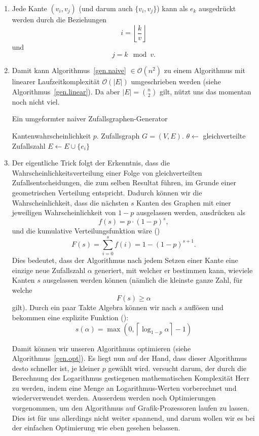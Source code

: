 \documentclass[11pt,abstracton]{scrreprt} %
\theoremstyle{definition}
\begin{document}
\begin{enumerate}
\item Jede Kante $(v_i, v_j)$ (und darum auch $\{v_i, v_j\}$) kann als $e_k$ ausgedrückt werden durch die Beziehungen
\[
i = \left\lfloor\frac k v \right\rfloor
\]
und
\[
j = k \mod v.
\]

\item Damit kann Algorithmus~\ref{gen.naive} $\in \mathcal{O}(n^2)$ zu einem Algorithmus mit linearer Laufzeitkomplexität $\mathcal{O}(|E|)$ umgeschrieben werden (siehe Algorithmus~\ref{gen.linear}). Da aber $|E| = \binom{n}{2}$ gilt, nützt uns das momentan noch nicht viel.

\begin{algorithm}
\caption{Ein umgeformter naiver Zufallsgraphen-Generator}
\label{gen.linear}
\begin{algorithmic}
\Require
	\Statex Kantenwahrscheinlichkeit $p$.
\Ensure
	\Statex Zufallsgraph $G = (V, E)$.
\Statex
{}
\State $\theta\gets$ gleichverteilte Zufallszahl
\State $E \gets E \cup \{e_i\}$
\EndIf
\EndFor
\end{algorithmic}
\end{algorithm}

\item Der eigentliche Trick folgt der Erkenntnis, dass die Wahrscheinlichkeitsverteilung einer Folge von gleichverteilten Zufallsentscheidungen, die zum selben Resultat führen, im Grunde einer geometrischen Verteilung entspricht. Dadurch können wir die Wahrscheinlichkeit, dass die nächsten $s$ Kanten des Graphen mit einer jeweiligen Wahrscheinlichkeit von $1-p$ ausgelassen werden, ausdrücken als
\[
	f(s) = p \cdot (1-p)^s,
\]
und die kumulative Verteilungsfunktion wäre (\cite{fastalgo})
\[
	F(s) = \sum\limits_{i=0}^s f(i) = 1 - (1-p)^{s+1}.
\]
Dies bedeutet, dass der Algorithmus nach jedem Setzen einer Kante eine einzige neue Zufallszahl $\alpha$ generiert, mit welcher er bestimmen kann, wieviele Kanten $s$ ausgelassen werden können (nämlich die kleinste ganze Zahl, für welche
\[
F(s) \ge \alpha
\]
gilt). Durch ein paar Takte Algebra können wir nach $s$ auflösen und bekommen eine explizite Funktion (\cite{fastalgo}):
\[
	s(\alpha) = \max(0, \left\lceil \log_{1-p}\alpha\right\rceil - 1)
\]

Damit können wir unseren Algorithmus optimieren (siehe Algorithmus~\ref{gen.opt}). Es liegt nun auf der Hand, dass dieser Algorithmus desto schneller ist, je kleiner $p$ gewählt wird. \cite{fastalgo} versucht darum, der durch die Berechnung des Logarithmus gestiegenen mathematischen Komplexität Herr zu werden, indem eine Menge an Logarithmus-Werten vorberechnet und wiederverwendet werden. Ausserdem werden noch Optimierungen vorgenommen, um den Algorithmus auf Grafik-Prozessoren laufen zu lassen. Dies ist für uns allerdings nicht weiter spannend, und darum wollen wir es bei der einfachen Optimierung wie eben gesehen belassen.


\end{enumerate}
\end{document}
